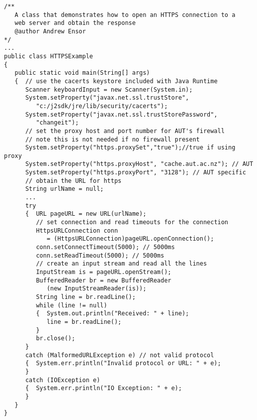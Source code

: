 \begin{figure*}\begin{program}\begin{verbatim}
/**
   A class that demonstrates how to open an HTTPS connection to a
   web server and obtain the response
   @author Andrew Ensor
*/
...
public class HTTPSExample
{
   public static void main(String[] args)
   {  // use the cacerts keystore included with Java Runtime
      Scanner keyboardInput = new Scanner(System.in);
      System.setProperty("javax.net.ssl.trustStore",
         "c:/j2sdk/jre/lib/security/cacerts");
      System.setProperty("javax.net.ssl.trustStorePassword",
         "changeit");
      // set the proxy host and port number for AUT's firewall
      // note this is not needed if no firewall present
      System.setProperty("https.proxySet","true");//true if using proxy
      System.setProperty("https.proxyHost", "cache.aut.ac.nz"); // AUT
      System.setProperty("https.proxyPort", "3128"); // AUT specific
      // obtain the URL for https
      String urlName = null;
      ...
      try
      {  URL pageURL = new URL(urlName);
         // set connection and read timeouts for the connection
         HttpsURLConnection conn
            = (HttpsURLConnection)pageURL.openConnection();
         conn.setConnectTimeout(5000); // 5000ms
         conn.setReadTimeout(5000); // 5000ms
         // create an input stream and read all the lines
         InputStream is = pageURL.openStream();
         BufferedReader br = new BufferedReader
            (new InputStreamReader(is));
         String line = br.readLine();
         while (line != null)
         {  System.out.println("Received: " + line);
            line = br.readLine();
         }
         br.close();
      }
      catch (MalformedURLException e) // not valid protocol
      {  System.err.println("Invalid protocol or URL: " + e);
      }
      catch (IOException e)
      {  System.err.println("IO Exception: " + e);
      }
   }
}
\end{verbatim}\end{program}\end{figure*}


%
%
%
%
